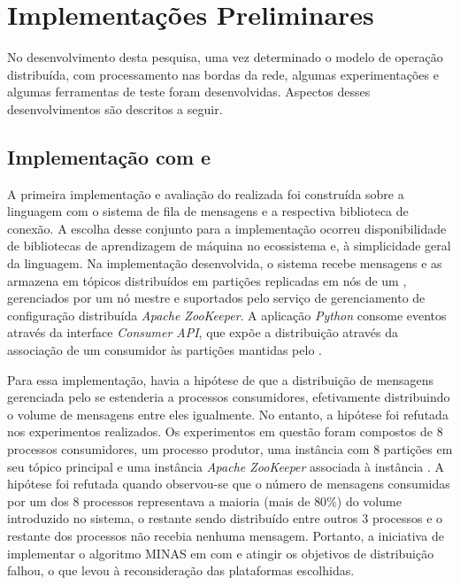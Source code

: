 
\section{Implementações Preliminares}\label{sec:resultados}

No desenvolvimento desta pesquisa, uma vez determinado o modelo de operação distribuída, com processamento nas bordas da rede, algumas experimentações e algumas ferramentas
de teste foram desenvolvidas. Aspectos desses desenvolvimentos são descritos a
seguir.

\subsection{Implementação com \python e \kafka}

A primeira implementação e avaliação do \mfog realizada foi construída sobre a
linguagem \python com o sistema de fila de mensagens \kafka e a respectiva
biblioteca de conexão.
A escolha desse conjunto para a implementação ocorreu 
disponibilidade de bibliotecas de aprendizagem de máquina no ecossistema
\python e, à simplicidade geral da linguagem.
Na implementação desenvolvida, o sistema \kafka recebe mensagens e as armazena
em tópicos distribuídos em partições replicadas em nós de um \cluster,
gerenciados por um nó mestre e suportados pelo serviço de gerenciamento de
configuração distribuída \emph{Apache ZooKeeper}.
A aplicação \emph{Python} consome eventos através da interface \emph{Consumer API},
que expõe a distribuição através da associação de um consumidor às partições
mantidas pelo \kafka.

Para essa implementação, havia a hipótese de que a distribuição de
mensagens gerenciada pelo \kafka
se estenderia a processos consumidores, efetivamente distribuindo o volume de
mensagens entre eles igualmente.
No entanto, a hipótese foi refutada nos experimentos realizados.
Os experimentos em questão foram compostos de 8 processos consumidores, um
processo produtor, uma instância \kafka com 8 partições em seu tópico principal
e uma instância \emph{Apache ZooKeeper} associada à instância \kafka.
A hipótese foi refutada quando observou-se que o número de
mensagens consumidas por um dos $8$ processos representava a maioria (mais de
$80\%$) do volume introduzido no sistema, o restante sendo distribuído entre
outros 3 processos e o restante dos processos não recebia nenhuma mensagem.
Portanto, a iniciativa de implementar o algoritmo MINAS em \python com \kafka e
atingir os objetivos de distribuição falhou, o que levou à reconsideração das
plataformas escolhidas.

